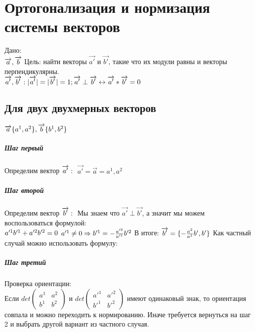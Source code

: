 \documentclass{book}
\begin{document}
\chapter{Ортогонализация и нормизация системы векторов}
Дано:\\
$\overrightarrow{a},\overrightarrow{b}\\$
Цель: найти векторы $\overrightarrow{a'}$ и $\overrightarrow{b'}$, такие что их модули равны и векторы перпендикулярны.\\
$\overrightarrow{a'},\overrightarrow{b'} : |\overrightarrow{a'}|=|\overrightarrow{b'}|=1;\overrightarrow{a'}\perp\overrightarrow{b'} \leftrightarrow \overrightarrow{a'}*\overrightarrow{b'}=0\\$
\section{Для двух двухмерных векторов}
$\overrightarrow{a}\{a^1,a^2\}, \overrightarrow{b}\{b^1,b^2\}\\$
\paragraph*{Шаг первый}
Определим вектор $\overrightarrow{a'}:\\$
$\overrightarrow{a'}=\overrightarrow{a}={a^1,a^2}$
\paragraph*{Шаг второй}
Определим вектор $\overrightarrow{b'}:\\$
Мы знаем что $\overrightarrow{a'}\perp\overrightarrow{b'}$, а значит мы можем воспользоваться формулой:\\
$a'^1b'^1+a'^2b'^2=0\\$
$a'^1\neq0 \Rightarrow b'^1=-\frac{a'^2}{a'^1}b'^2\\$
В итоге: $\overrightarrow{b'}=\{-\frac{a^2}{a^1}b',b'\}\\$
Как частный случай можно использовать формулу:
\paragraph*{Шаг третий}
Проверка ориентации:\\
Если 
$det
    \begin{pmatrix}
        {a^1} & {a^2}\\
        {b^1} & {b^2}
    \end{pmatrix}
$ и $det
\begin{pmatrix}
    {a'^1} & {a'^2}\\
    {b'^1} & {b'^2}
\end{pmatrix}
$ имеют одинаковый знак, то ориентация совпала и можно переходить к нормированию. Иначе требуется вернуться на шаг 2 и выбрать другой вариант из частного случая.
\end{document}
